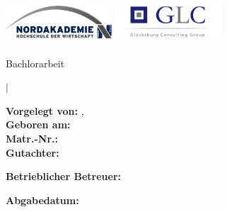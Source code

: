 \thispagestyle{empty}
\vspace{2cm}
\begin{center}
\includegraphics[height=60px, width= 150px]{images/uni-logo} 
\hspace{1cm}
\includegraphics[height=60px, width= 150px]{images/Logo-GLC1} %
\\\vspace{1cm}

\Large{\dctitle}

\vspace{1cm}
\large{Bachlorarbeit}

\vspace{5mm}
\large{\dcfaculty $|$
 \dcuniversity}
\vspace{1	cm}
\end{center}
{\large
\begin{flushleft}
\textbf{Vorgelegt von:} \dcauthorsurname, \dcauthorname \\
\textbf{Geboren am:} \dcauthoradd\\
\textbf{Matr.-Nr.:} \dcauthorno \\
\textbf{Gutachter:} \\
\begin{tightlist}
	\item \dcapprovala
	\item \dcapprovalb
\end{tightlist}

\textbf{Betrieblicher Betreuer:} \\
\begin{tightlist}
	\item \dcada
\end{tightlist}
\vspace{5mm}
\textbf{Abgabedatum:} \dcdatesubmitted\\
\end{flushleft}
}
\vspace{1cm}

\newpage
